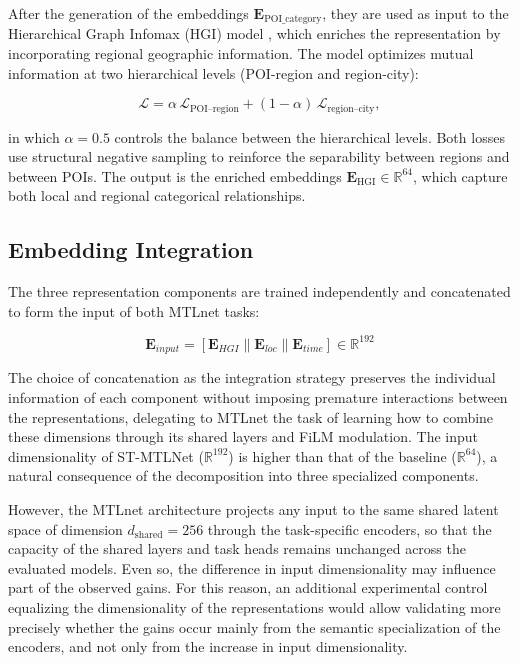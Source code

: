 After the generation of the embeddings $\mathbf{E}_{\text{POI\_category}}$, they are used as input to the Hierarchical Graph Infomax (HGI) model \cite{huang2023hgi}, which enriches the representation by incorporating regional geographic information. The model optimizes mutual information at two hierarchical levels (POI-region and region-city):

\[
\mathcal{L}
=
\alpha\,\mathcal{L}_{\text{POI--region}}
+
(1-\alpha)\,\mathcal{L}_{\text{region--city}},
\]

in which $\alpha = 0.5$ controls the balance between the hierarchical levels. Both losses use structural negative sampling to reinforce the separability between regions and between POIs. The output is the enriched embeddings $\mathbf{E}_{\text{HGI}} \in \mathbb{R}^{64}$, which capture both local and regional categorical relationships.

\subsection{Embedding Integration}

The three representation components are trained independently and concatenated to form the input of both MTLnet tasks:

\begin{equation}
\mathbf{E}_{input} = [\mathbf{E}_{HGI} \| \mathbf{E}_{loc} \| \mathbf{E}_{time}] \in \mathbb{R}^{192}
\label{eq:courb:concat}
\end{equation}

The choice of concatenation as the integration strategy preserves the individual information of each component without imposing premature interactions between the representations, delegating to MTLnet the task of learning how to combine these dimensions through its shared layers and FiLM modulation. The input dimensionality of ST-MTLNet ($\mathbb{R}^{192}$) is higher than that of the baseline ($\mathbb{R}^{64}$), a natural consequence of the decomposition into three specialized components.

However, the MTLnet architecture projects any input to the same shared latent space of dimension $d_{\mathrm{shared}} = 256$ through the task-specific encoders, so that the capacity of the shared layers and task heads remains unchanged across the evaluated models. Even so, the difference in input dimensionality may influence part of the observed gains. For this reason, an additional experimental control equalizing the dimensionality of the representations would allow validating more precisely whether the gains occur mainly from the semantic specialization of the encoders, and not only from the increase in input dimensionality.

